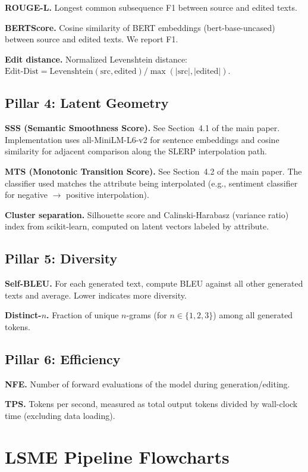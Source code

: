 \documentclass{article}
\begin{document}
\textbf{ROUGE-L.} Longest common subsequence F1 between source and edited texts.

\textbf{BERTScore.} Cosine similarity of BERT embeddings (bert-base-uncased) between source and edited texts. We report F1.

\textbf{Edit distance.} Normalized Levenshtein distance: $\text{Edit-Dist} = \text{Levenshtein}(\text{src}, \text{edited}) / \max(|\text{src}|, |\text{edited}|)$.

\subsection{Pillar 4: Latent Geometry}

\textbf{SSS (Semantic Smoothness Score).} See Section~4.1 of the main paper. Implementation uses all-MiniLM-L6-v2 for sentence embeddings and cosine similarity for adjacent comparison along the SLERP interpolation path.

\textbf{MTS (Monotonic Transition Score).} See Section~4.2 of the main paper. The classifier used matches the attribute being interpolated (e.g., sentiment classifier for negative $\to$ positive interpolation).

\textbf{Cluster separation.} Silhouette score and Calinski-Harabasz (variance ratio) index from scikit-learn, computed on latent vectors labeled by attribute.

\subsection{Pillar 5: Diversity}

\textbf{Self-BLEU.} For each generated text, compute BLEU against all other generated texts and average. Lower indicates more diversity.

\textbf{Distinct-$n$.} Fraction of unique $n$-grams (for $n \in \{1, 2, 3\}$) among all generated tokens.

\subsection{Pillar 6: Efficiency}

\textbf{NFE.} Number of forward evaluations of the model during generation/editing.

\textbf{TPS.} Tokens per second, measured as total output tokens divided by wall-clock time (excluding data loading).

\section{LSME Pipeline Flowcharts}
\label{app:flowcharts}
\end{document}
